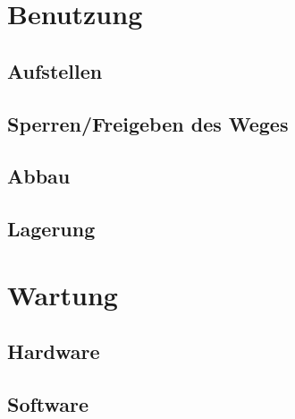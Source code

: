 \documentclass[a4paper, ngerman]{scrartcl}
\begin{document}
\section{Benutzung}
\subsection{Aufstellen}
\subsection{Sperren/Freigeben des Weges}
\subsection{Abbau}
\subsection{Lagerung}

\section{Wartung}
\subsection{Hardware}
\subsection{Software}
\end{document}
